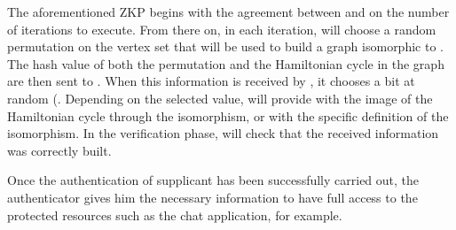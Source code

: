 \documentclass[conference]{IEEEtran}
\begin{document}
The aforementioned ZKP begins with the agreement between  and
 on the number of iterations  to execute. From there on, in
each iteration,  will choose a random permutation
 on the vertex set that will be used to build a
graph  isomorphic to . The hash value of both the
permutation  and the Hamiltonian cycle in the
graph   are then sent to . When this
information is received by , it chooses a bit  at random
(. Depending on the selected
value,  will provide  with the image  of the Hamiltonian
cycle through the isomorphism, or with the specific definition of
the isomorphism. In the verification phase,  will check that
the received information was correctly built.

Once the authentication of supplicant  has been successfully
carried out, the authenticator  gives him the necessary
information to have full access to the protected resources such as
the chat application, for example.
\end{document}
